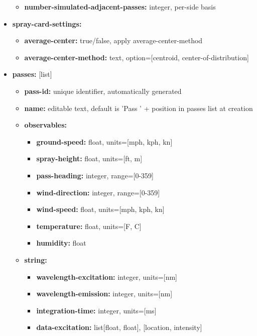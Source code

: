 \documentclass[10pt,letterpaper,titlepage]{article}
\begin{document}
\begin{itemize}
\begin{itemize}
            \item \textbf{number-simulated-adjacent-passes:} integer, per-side basis
        \end{itemize}
        \item \textbf{spray-card-settings:} 
        \begin{itemize}
            \item \textbf{average-center:} true/false, apply average-center-method
            \item \textbf{average-center-method:} text, option=[centroid, center-of-distribution]
        \end{itemize}
        \item \textbf{passes:} [list]
        \begin{itemize}
            \item \textbf{pass-id:} unique identifier, automatically generated
            \item \textbf{name:} editable text, default is 'Pass ' + position in passes list at creation
            \item \textbf{observables:} 
            \begin{itemize}
                \item \textbf{ground-speed:} float, units=[mph, kph, kn]
                \item \textbf{spray-height:} float, units=[ft, m]
                \item \textbf{pass-heading:} integer, range=[0-359]
                \item \textbf{wind-direction:} integer, range=[0-359]
                \item \textbf{wind-speed:} float, units=[mph, kph, kn]
                \item \textbf{temperature:} float, units=[\degree F, \degree C]
                \item \textbf{humidity:} float
            \end{itemize}
            \item \textbf{string:} 
            \begin{itemize}
                \item \textbf{wavelength-excitation:} integer, units=[nm]
                \item \textbf{wavelength-emission:} integer, units=[nm]
                \item \textbf{integration-time:} integer, units=[ms]
                \item \textbf{data-excitation:} list[float, float], [location, intensity]

\end{itemize}
\end{itemize}
\end{itemize}
\end{document}

